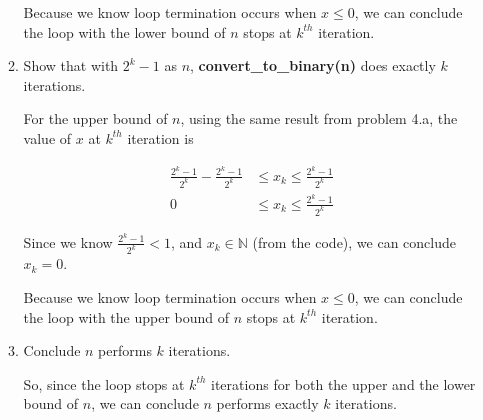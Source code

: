 \documentclass[12pt]{article}
\begin{document}
\begin{enumerate}[a.]
\begin{mdframed}
\begin{enumerate}[1.]
\begin{mdframed}
            \bigskip

            Because we know loop termination occurs when $x \leq 0$, we can conclude
            the loop with the lower bound of $n$ stops at $k^{th}$ iteration.

            \end{mdframed}

            \bigskip

            \item Show that with $2^k - 1$ as $n$, \textbf{convert\_to\_binary(n)}
            does exactly $k$ iterations.

            \bigskip

            \begin{mdframed}
            For the upper bound of $n$, using the same result from problem 4.a,
            the value of $x$ at $k^{th}$ iteration is

            \bigskip

            \begin{align}
                \frac{2^k - 1}{2^k} - \frac{2^k - 1}{2^k} &\leq x_k \leq \frac{2^k - 1}{2^k}\\
                0 &\leq x_k \leq \frac{2^k - 1}{2^k}
            \end{align}

            \bigskip

            Since we know $\frac{2^k - 1}{2^k} < 1$, and $x_k \in \mathbb{N}$ (from the code),
            we can conclude $x_k = 0$.

            \bigskip

            Because we know loop termination occurs when $x \leq 0$, we can conclude
            the loop with the upper bound of $n$ stops at $k^{th}$ iteration.

            \end{mdframed}

            \item Conclude $n$ performs $k$ iterations.

            \bigskip

            \begin{mdframed}
            So, since the loop stops at $k^{th}$ iterations for both the upper
            and the lower bound of $n$, we can conclude $n$ performs exactly
            $k$ iterations.
            \end{mdframed}

        \end{enumerate}

    \end{mdframed}

\end{enumerate}
\end{document}

